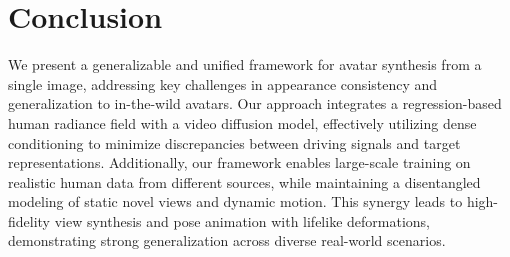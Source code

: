 \section{Conclusion}
\label{sec:conclusion}
We present a generalizable and unified framework for avatar synthesis from a single image, addressing key challenges in appearance consistency and generalization to in-the-wild avatars. Our approach integrates a regression-based human radiance field with a video diffusion model, effectively utilizing dense conditioning to minimize discrepancies between driving signals and target representations. Additionally, our framework enables large-scale training on realistic human data from different sources, while maintaining a disentangled modeling of static novel views and dynamic motion. This synergy leads to high-fidelity view synthesis and pose animation with lifelike deformations, demonstrating strong generalization across diverse real-world scenarios.
